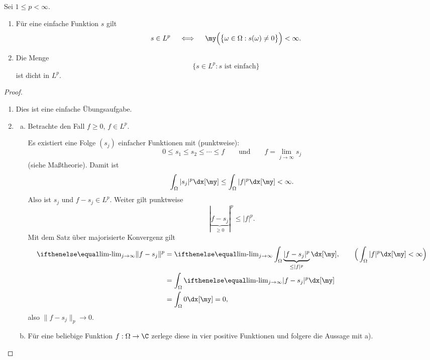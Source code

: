\begin{st} \label{2.15}
	Sei $1 \le p < \infty$.
	\begin{enumerate}[1)]
		\item
			Für eine einfache Funktion $s$ gilt
			\[
				s \in L^p
				\quad \iff \quad
				\my\Big( \big\{ \omega \in \Omega : s(\omega) \neq 0 \big\} \Big) < \infty.
			\]
		\item
			Die Menge
			\[
				\Big\{ s \in L^p : s \text{ ist einfach} \Big\}
			\]
			ist dicht in $L^p$.
	\end{enumerate}
	\begin{proof}
		\begin{enumerate}[1)]
			\item
				Dies ist eine einfache Übungsaufgabe.
			\item
				\begin{enumerate}[a)]
					\item
						Betrachte den Fall $f \ge 0$, $f \in L^p$.

						Es existiert eine Folge $(s_j)$ einfacher Funktionen mit (punktweise):
						\[
							0 \le s_1 \le s_2 \le \dotsb \le f
							\qquad \text{und} \qquad
							f = \lim_{j\to \infty} s_j
						\]
						(siehe Maßtheorie).
						Damit ist
						\[
							\int_{\Omega} |s_j|^p \dx[\my]
							\le \int_{\Omega} |f|^p \dx[\my]
							< \infty.
						\]
						Also ist $s_j$ und $f-s_j \in L^p$.
						Weiter gilt punktweise
						\[
							|\underbrace{f - s_j}_{\ge 0}|^p \le |f|^p.
						\]
						Mit dem Satz über majorisierte Konvergenz gilt
						\begin{align*}
							\lim_{j\to \infty} \|f - s_j\|^p
							&= \lim_{j\to \infty} \int_{\Omega} \underbrace{|f-s_j|^p}_{\le |f|^p} \dx[\my],  \qquad \Big(\int_{\Omega} |f|^p \dx[\my] < \infty\Big)\\
							&= \int_{\Omega} \lim_{j\to \infty} |f- s_j |^p \dx[\my] \\
							&= \int_{\Omega} 0 \dx[\my]
							= 0,
						\end{align*}
						also $\|f-s_j\|_p \to 0$.
					\item
						Für eine beliebige Funktion $f: \Omega \to \C$ zerlege diese in vier positive Funktionen und folgere die Aussage mit a).
				\end{enumerate}
		\end{enumerate}
	\end{proof}
\end{st}


